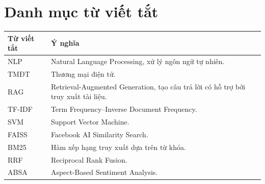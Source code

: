 \documentclass[12pt,a4paper]{report}
\def\TFIDF{TF-IDF}%
\DeclareRobustCommand{\TFIDF}{\texorpdfstring{\mbox{TF-IDF}}{TF-IDF}}
\begin{document}
\chapter*{Danh mục từ viết tắt}
\begin{longtable}{p{}p{}}
\toprule
Từ viết tắt & Ý nghĩa \\
\midrule
NLP & Natural Language Processing, xử lý ngôn ngữ tự nhiên. \\
TMĐT & Thương mại điện tử. \\
RAG & Retrieval-Augmented Generation, tạo câu trả lời có hỗ trợ bởi truy xuất tài liệu. \\
\TFIDF{} & Term Frequency--Inverse Document Frequency. \\
SVM & Support Vector Machine. \\
FAISS & Facebook AI Similarity Search. \\
BM25 & Hàm xếp hạng truy xuất dựa trên từ khóa. \\
RRF & Reciprocal Rank Fusion. \\
ABSA & Aspect-Based Sentiment Analysis. \\
\bottomrule
\end{longtable}
\cleardoublepage
{}











\appendix

\cleardoublepage
{}

\end{document}
